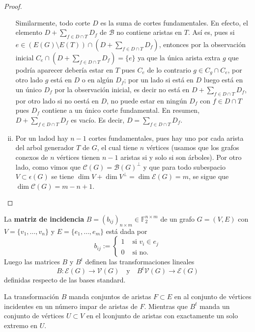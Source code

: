 \documentclass[../main.tex]{subfiles}
\begin{document}
\begin{proof}
\begin{enumerate}[(i)]
Similarmente, todo corte $D$ es la suma de cortes fundamentales. En efecto, el elemento $D + \sum_{f \in D \cap T} D_f$ de $\mathcal B$ no contiene aristas en $T$. Así es, pues si $e \in (E(G) \setminus E(T)) \cap (D + \sum_{f \in D \cap T} D_f)$, entonces por la observación inicial $C_e \cap (D + \sum_{f \in D \cap T} D_f) = \{e\}$ ya que la única arista extra $g$ que podría aparecer debería estar en $T$ pues $C_e$ de lo contrario $g \in C_g \cap C_e$, por otro lado $g$ está en $D$ o en algún $D_f$; por un lado si está en $D$ luego está en un único $D_f$ por la observación inicial, es decir no está en $D + \sum_{f \in D \cap T} D_f$, por otro lado si no oestá en $D$, no puede estar en ningún $D_f$ con $f \in D \cap T$ pues $D_f$ contiene a un único corte fundamental. En resumen, $D + \sum_{f \in D \cap T} D_f$ es vacío. Es decir, $D = \sum_{f \in D \cap T} D_f$.
\item Por un ladod hay $n-1$ cortes fundamentales, pues hay uno por cada arista del arbol generador $T$ de $G$, el cual tiene $n$ vértices (usamos que los grafos conexos de $n$ vértices tienen $n-1$ aristas si y solo si son árboles). Por otro lado, como vimos que $\mathcal C (G) = \mathcal B (G)^\perp$ y que para todo subespacio $V \subset \mathcal \epsilon (G)$ se tiene $\dim V + \dim V^\perp = \dim \mathcal E (G) = m$, se sigue que $\dim \mathcal C (G) = m-n+1$.
\end{enumerate}
\end{proof}


\begin{definition}
    La \textbf{matriz de incidencia} $B = (b_{ij})_{n \times m} \in \mathbb{F}_2^{n\times m}$ de un grafo $G = (V,E)$
    con $V = \{ v_1
    ,\ldots, v_n\}$ y $E = \{e_1,\ldots,e_m\}$ está dada por
    \[
        b_{ij} := \begin{cases}
                    1 & \text{ si $v_i \in e_j$}\\
                    0 & \text{ si no.}
                    \end{cases}
    \]
    Luego las matrices $B$ y $B^t$ definen las transformaciones lineales
    \[
        B : \mathcal E (G) \rightarrow \mathcal V (G) \quad \text{y} \quad B^t \mathcal V (G) \rightarrow \mathcal E (G)
    \]
    definidas respecto de las bases standard.
\end{definition}

\begin{obs}
La transformación $B$ manda conjuntos de aristas $F \subset E$ en al conjunto de vértices incidentes en un número
impar de aristas de $F$. Mientras que $B^t$ manda un conjunto de vértices $U \subset V$ en el lconjunto de aristas
con exactamente un solo extremo en $U$.
\end{obs}
\end{document}
